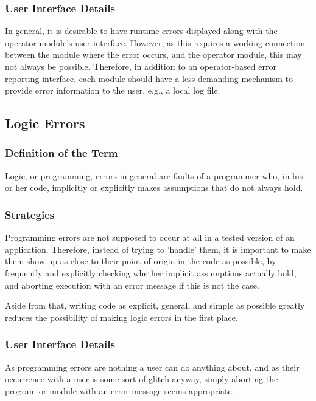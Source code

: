 \documentclass[12pt,a4paper]{article}
\begin{document}
\subsubsection{User Interface Details}

In general, it is desirable to have runtime errors displayed
along with the operator module's user interface. However,
as this requires a working connection between the module where
the error occurs, and the operator module, this may not
always be possible. Therefore, in addition to an
operator-based error reporting interface, each module should
have a less demanding mechanism to provide error information to the
user, e.g., a local log file.

\subsection{Logic Errors}

\subsubsection{Definition of the Term}

Logic, or programming, errors in general are faults of
a programmer who, in his or her code, implicitly or explicitly
makes assumptions that do not always hold.

\subsubsection{Strategies}

Programming errors are not supposed to occur at all in
a tested version of an application. Therefore, instead
of trying to 'handle' them, it is important to make them show
up as close to their point of origin in the code as
possible, by frequently and explicitly checking whether
implicit assumptions actually hold, and aborting execution
with an error message if this is not the case.

Aside from that, writing code as explicit, general, and
simple as possible greatly reduces the possibility of making
logic errors in the first place.

\subsubsection{User Interface Details}

As programming errors are nothing a user can do anything
about, and as their occurrence with a user is some sort of
glitch anyway, simply aborting the program or module with
an error message seems appropriate.
\end{document}
